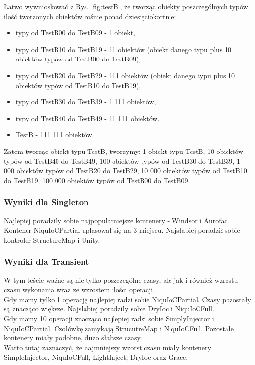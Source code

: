 \documentclass[12pt]{article}
\begin{document}
Łatwo wywnioskować z Rys. \ref{fig:testB}, że tworząc obiekty poszczególnych typów ilość tworzonych obiektów rośnie ponad dziesięciokortnie:
\begin{itemize}
	\item typy od TestB00 do TestB09 - 1 obiekt,
	\item typy od TestB10 do TestB19 - 11 obiektów (obiekt danego typu plus 10 obiektów typów od TestB00 do TestB09),
	\item typy od TestB20 do TestB29 - 111 obiektów (obiekt danego typu plus 10 obiektów typów od TestB10 do TestB19),
	\item typy od TestB30 do TestB39 - 1 111 obiektów,
	\item  typy od TestB40 do TestB49 - 11 111 obiektów,
	\item TestB - 111 111 obiektów.
\end{itemize}
Zatem tworząc obiekt typu TestB, tworzymy: 1 obiekt typu TestB, 10 obiektów typów od TestB40 do TestB49, 100 obiektów typów od TestB30 do TestB39, 1 000 obiektów typów od TestB20 do TestB29, 10 000 obiektów typów od TestB10 do TestB19, 100 000 obiektów typów od TestB00 do TestB09.

\subsubsection{Wyniki dla Singleton}
Najlepiej poradziły sobie najpopularniejsze kontenery - Windsor i Aurofac. Kontener NiquIoCPartial uplasował się na 3 miejscu. Najsłabiej poradził sobie kontroler StructureMap i Unity.

\subsubsection{Wyniki dla Transient}
W tym teście ważne są nie tylko poszczególne czasy, ale jak i również wzrostu czasu wykonania wraz ze wzrostem ilości operacji.\\
Gdy mamy tylko 1 operację najlepiej radzi sobie NiquIoCPartial. Czasy pozostały są znacząco większe. Najsłabiej poradziły sobie DryIoc i NiquIoCFull.\\
Gdy mamy 10 operacji znacząco najlepiej radzi sobie SimplyInjector i NiquIoCPartial. Czołówkę zamykają StrucutreMap i NiquIoCFull. Pozostałe kontenery miały podobne, dużo słabsze czasy.\\
Warto tutaj zaznaczyć, że najmniejszy wzorst czasu miały kontenery SimpleInjector, NiquIoCFull, LightInject, DryIoc oraz Grace.
\end{document}
